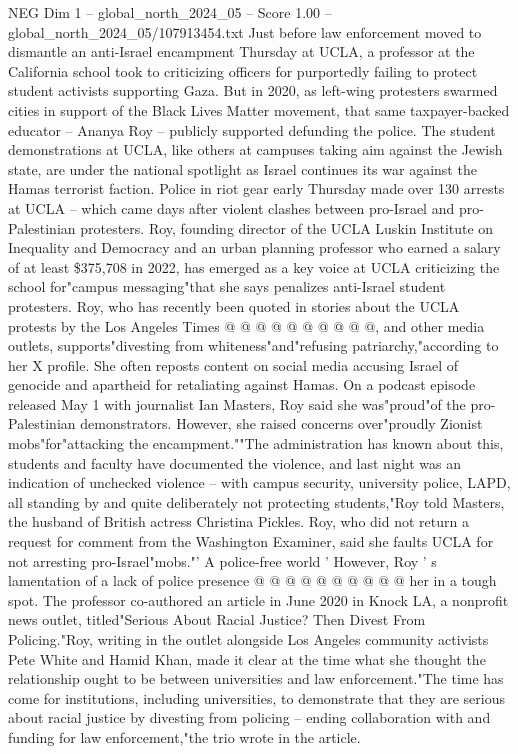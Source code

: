 \begin{textsample}{NEG Dim 1 – global\_north\_2024\_05 – Score 1.00 – global\_north\_2024\_05/107913454.txt}  \label{ex:f1_neg_178}
Just before law enforcement moved to dismantle an anti-Israel encampment Thursday at UCLA, a professor at the California school took to criticizing officers for purportedly failing to protect student activists supporting Gaza.
But in 2020, as left-wing protesters swarmed cities in support of the Black Lives Matter movement, that same taxpayer-backed educator -- Ananya Roy -- publicly supported defunding the police.
The student demonstrations at UCLA, like others at campuses taking aim against the Jewish state, are under the national spotlight as Israel continues its war against the Hamas terrorist faction.
Police in riot gear early Thursday made over 130 arrests at UCLA -- which came days after violent clashes between pro-Israel and pro-Palestinian protesters.
Roy, founding director of the UCLA Luskin Institute on Inequality and Democracy and an urban planning professor who earned a salary of at least \$375,708 in 2022, has emerged as a key voice at UCLA criticizing the school for"campus messaging"that she says penalizes anti-Israel student protesters.
Roy, who has recently been quoted in stories about the UCLA protests by the Los Angeles Times @ @ @ @ @ @ @ @ @ @, and other media outlets, supports"divesting from whiteness"and"refusing patriarchy,"according to her X profile.
She often reposts content on social media accusing Israel of genocide and apartheid for retaliating against Hamas.
On a podcast episode released May 1 with journalist Ian Masters, Roy said she was"proud"of the pro-Palestinian demonstrators.
However, she raised concerns over"proudly Zionist mobs"for"attacking the encampment.""The administration has known about this, students and faculty have documented the violence, and last night was an indication of unchecked violence -- with campus security, university police, LAPD, all standing by and quite deliberately not protecting students,"Roy told Masters, the husband of British actress Christina Pickles.
Roy, who did not return a request for comment from the Washington Examiner, said she faults UCLA for not arresting pro-Israel"mobs."' A police-free world ' However, Roy ' s lamentation of a lack of police presence @ @ @ @ @ @ @ @ @ @ her in a tough spot.
The professor co-authored an article in June 2020 in Knock LA, a nonprofit news outlet, titled"Serious About Racial Justice?
Then Divest From Policing."Roy, writing in the outlet alongside Los Angeles community activists Pete White and Hamid Khan, made it clear at the time what she thought the relationship ought to be between universities and law enforcement."The time has come for institutions, including universities, to demonstrate that they are serious about racial justice by divesting from policing -- ending collaboration with and funding for law enforcement,"the trio wrote in the article.

\end{textsample}
